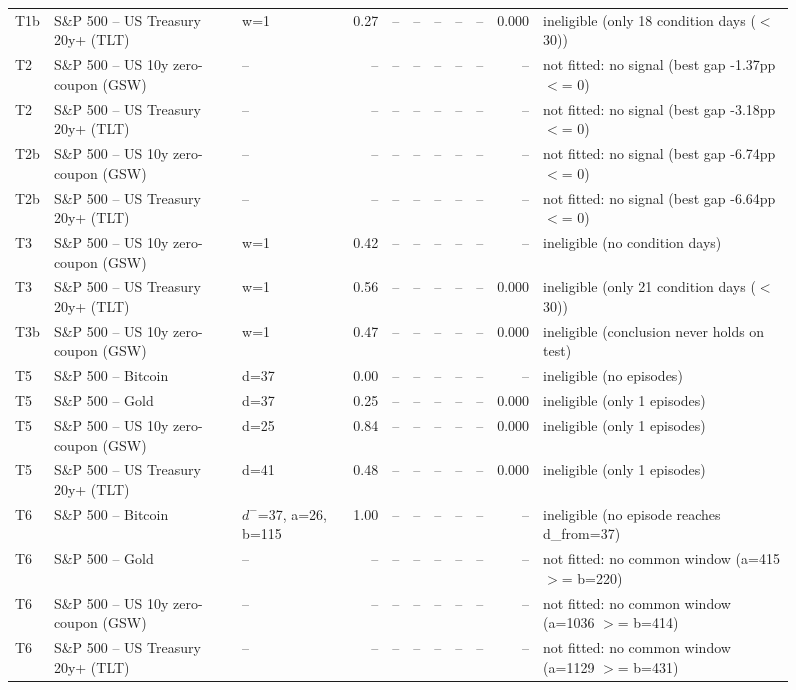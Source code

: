 \begin{figure}
\begin{tabular}{lllrrrrrrrl}
T1b & S\&P 500 -- US Treasury 20y+ (TLT) & w=1 & 0.27 & -- & -- & -- & -- & -- & 0.000 & ineligible (only 18 condition days ($<$ 30)) \\
T2 & S\&P 500 -- US 10y zero-coupon (GSW) & -- & -- & -- & -- & -- & -- & -- & -- & not fitted: no signal (best gap -1.37pp $<$= 0) \\
T2 & S\&P 500 -- US Treasury 20y+ (TLT) & -- & -- & -- & -- & -- & -- & -- & -- & not fitted: no signal (best gap -3.18pp $<$= 0) \\
T2b & S\&P 500 -- US 10y zero-coupon (GSW) & -- & -- & -- & -- & -- & -- & -- & -- & not fitted: no signal (best gap -6.74pp $<$= 0) \\
T2b & S\&P 500 -- US Treasury 20y+ (TLT) & -- & -- & -- & -- & -- & -- & -- & -- & not fitted: no signal (best gap -6.64pp $<$= 0) \\
T3 & S\&P 500 -- US 10y zero-coupon (GSW) & w=1 & 0.42 & -- & -- & -- & -- & -- & -- & ineligible (no condition days) \\
T3 & S\&P 500 -- US Treasury 20y+ (TLT) & w=1 & 0.56 & -- & -- & -- & -- & -- & 0.000 & ineligible (only 21 condition days ($<$ 30)) \\
T3b & S\&P 500 -- US 10y zero-coupon (GSW) & w=1 & 0.47 & -- & -- & -- & -- & -- & 0.000 & ineligible (conclusion never holds on test) \\
T5 & S\&P 500 -- Bitcoin & d=37 & 0.00 & -- & -- & -- & -- & -- & -- & ineligible (no episodes) \\
T5 & S\&P 500 -- Gold & d=37 & 0.25 & -- & -- & -- & -- & -- & 0.000 & ineligible (only 1 episodes) \\
T5 & S\&P 500 -- US 10y zero-coupon (GSW) & d=25 & 0.84 & -- & -- & -- & -- & -- & 0.000 & ineligible (only 1 episodes) \\
T5 & S\&P 500 -- US Treasury 20y+ (TLT) & d=41 & 0.48 & -- & -- & -- & -- & -- & 0.000 & ineligible (only 1 episodes) \\
T6 & S\&P 500 -- Bitcoin & $d^-$=37, a=26, b=115 & 1.00 & -- & -- & -- & -- & -- & -- & ineligible (no episode reaches d\_from=37) \\
T6 & S\&P 500 -- Gold & -- & -- & -- & -- & -- & -- & -- & -- & not fitted: no common window (a=415 $>$= b=220) \\
T6 & S\&P 500 -- US 10y zero-coupon (GSW) & -- & -- & -- & -- & -- & -- & -- & -- & not fitted: no common window (a=1036 $>$= b=414) \\
T6 & S\&P 500 -- US Treasury 20y+ (TLT) & -- & -- & -- & -- & -- & -- & -- & -- & not fitted: no common window (a=1129 $>$= b=431) \\

\end{tabular}
\end{figure}
